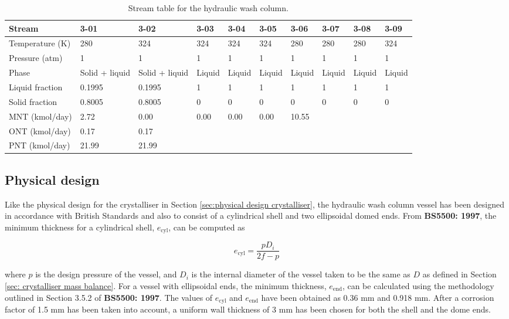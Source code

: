 \begin{table}[h]
\centering
\caption{Stream table for the hydraulic wash column.}
\label{tab:wash column stream table}
\begin{tabular}{@{}l|l|l|l|l|l|l|l|l|l@{}}
\toprule
Stream            & 3-01 & 3-02 & 3-03 & 3-04 & 3-05 & 3-06 & 3-07 & 3-08 & 3-09 \\ \midrule
Temperature (K)   & 280 & 324 & 324 & 324 & 324 & 280 & 280 & 280 & 324 \\ \midrule
Pressure (atm)    & 1   & 1   & 1   & 1   & 1   & 1   & 1   & 1   & 1 \\ \midrule
Phase & Solid + liquid & Solid + liquid & Liquid & Liquid & Liquid & Liquid & Liquid & Liquid & Liquid \\ \midrule
Liquid fraction &  0.1995 &  0.1995 & 1 & 1 & 1 & 1 & 1 & 1 & 1\\ \midrule
Solid fraction  &  0.8005  &  0.8005 & 0 & 0 & 0 & 0 & 0 & 0 & 0 \\ \midrule
MNT (kmol/day)  &  2.72 & 0.00 & 0.00 & 0.00 & 0.00 &10.55 \\ \midrule
ONT (kmol/day)  &  0.17 & 0.17 \\ \midrule
PNT (kmol/day)  &  21.99 & 21.99 \\ \bottomrule
\end{tabular}
\end{table}

\subsection{Physical design}
Like the physical design for the crystalliser in Section \ref{sec:physical design crystalliser}, the hydraulic wash column vessel has been designed in accordance with British Standards and also to consist of a cylindrical shell and two ellipsoidal domed ends. From \textbf{BS5500: 1997}, the minimum thickness for a cylindrical shell, $e_{\mathrm{cyl}}$, can be computed as 

\begin{equation}
    e_{\mathrm{cyl}} = \frac{p D_i}{2f - p}
\end{equation}

\noindent where $p$ is the design pressure of the vessel, and $D_i$ is the internal diameter of the vessel taken to be the same as $D$ as defined in Section \ref{sec: crystalliser mass balance}. For a vessel with ellipsoidal ends, the minimum thickness, $e_{\mathrm{end}}$, can be calculated using the methodology outlined in Section 3.5.2 of \textbf{BS5500: 1997}. The values of $e_{\mathrm{cyl}}$ and $e_{\mathrm{end}}$ have been obtained as 0.36 mm and 0.918 mm. After a corrosion factor of 1.5 mm has been taken into account, a uniform wall thickness of 3 mm has been chosen for both the shell and the dome ends. 

